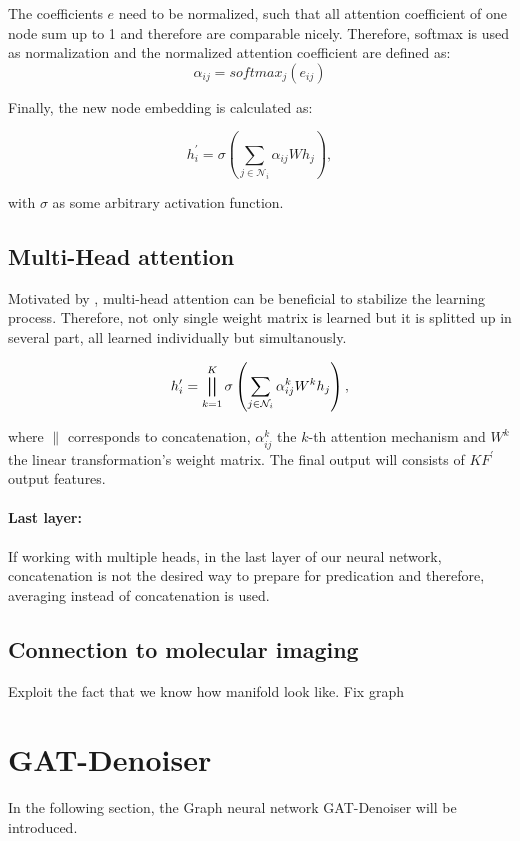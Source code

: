 The coefficients $e$ need to be normalized, such that all attention coefficient of one node sum up to 1 and therefore are comparable nicely.
Therefore, softmax is used as normalization and the normalized attention coefficient are defined as:
\begin{equation}
  \alpha_{ij} = softmax_j(e_{ij})
\end{equation}


Finally, the new node embedding is calculated as:

\begin{equation}
  h_i^{\prime} = \sigma \left( \sum_{j \in \mathcal{N}_i} \alpha_{ij} W h_j \right),
\end{equation}

with $\sigma$ as some arbitrary activation function.

\subsection{Multi-Head attention}
Motivated by \citet{transformer}, multi-head attention can be beneficial to stabilize the learning process.
Therefore, not only single weight matrix is learned but it is splitted up in several part, all learned individually but simultanously.


\begin{equation}
  h_i^{\prime} = \bigparallel^K_{k=1} \sigma \left(\sum_{j \in \mathcal{N}_i} \alpha_{ij}^k W^k h_j \right),  
\end{equation}

where $\parallel$ corresponds to concatenation, $\alpha_{ij}^k$ the $k$-th attention mechanism and $W^k$ the linear
transformation's weight matrix. The final output will consists of $KF^{\prime}$ output features.

\paragraph{Last layer:}
If working with multiple heads, in the last layer of our neural network, concatenation is not the desired 
way to prepare for predication and therefore, averaging instead of concatenation is used.

\subsection{Connection to molecular imaging}
Exploit the fact that we know how manifold look like.
Fix graph

\section{GAT-Denoiser}
In the following section, the Graph neural network GAT-Denoiser will be introduced.

